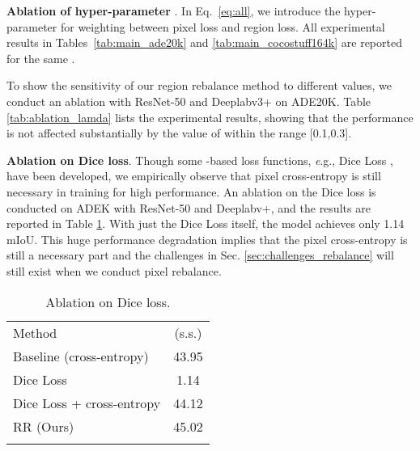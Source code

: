 \documentclass[final]{cvpr}
\begin{document}
\vspace{1mm}
\noindent\textbf{Ablation of hyper-parameter }.
In Eq.~\eqref{eq:all}, we introduce the hyper-parameter  for weighting between pixel loss and region loss. All experimental results in Tables~\ref{tab:main_ade20k} and \ref{tab:main_cocostuff164k} are reported for the same . 

To show the sensitivity of our region rebalance method to different  values, we conduct an ablation with ResNet-50 and Deeplabv3+ on ADE20K. Table \ref{tab:ablation_lamda} lists the experimental results, showing that the performance is not affected substantially by the value of  within the range [0.1,0.3].

\vspace{1mm}
\noindent\textbf{Ablation on Dice loss}.
Though some -based loss functions, {\textit e.g.}, Dice Loss \cite{milletari2016v}, have been developed, we empirically observe that pixel cross-entropy is still necessary in training for high performance. An ablation on the Dice loss is conducted on ADEK with ResNet-50 and Deeplabv+, and the results are reported in Table \ref{tab:ablation_dice}. With just the Dice Loss itself, the model achieves only 1.14 mIoU. This huge performance degradation implies that the pixel cross-entropy is still a necessary part and the challenges in Sec. \ref{sec:challenges_rebalance} will still exist when we conduct pixel rebalance. 


\begin{table}[t]
	\centering
	\setlength{\tabcolsep}{15pt}
	\caption{Ablation on Dice loss.}
	\label{tab:ablation_dice}
	{
		\begin{tabular}{l|c}
			\shline
			Method  &(s.s.) \\
			\shline
			Baseline (cross-entropy)    &43.95 \\
			\shline
            Dice Loss                   &1.14 \\
            Dice Loss + cross-entropy   &44.12\\
			\shline
			RR (Ours)                   &45.02\\
			\shline
		\end{tabular}
	}
	\vspace{-0.15in}
\end{table}

\vspace{-0.1in}
\end{document}
